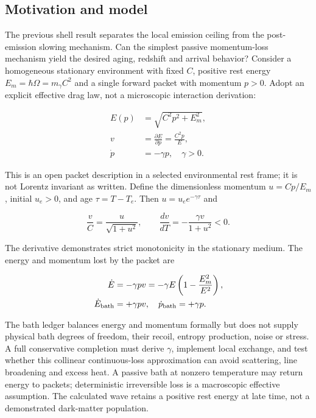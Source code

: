 \documentclass[
  11pt,
  twoside]{article}
\begin{document}
\subsection{Motivation and model}\label{motivation-and-model}

The previous shell result separates the local emission ceiling from the
post-emission slowing mechanism. Can the simplest passive momentum-loss
mechanism yield the desired aging, redshift and arrival behavior?
Consider a homogeneous stationary environment with fixed \(C\), positive
rest energy \(E_m=\hbar\Omega=m_\gamma C^2\) and a single forward packet
with momentum \(p>0\). Adopt an explicit effective drag law, not a
microscopic interaction derivation:

\[\begin{aligned}E(p)&=\sqrt{C^2p^2+E_m^2},\\v&=\frac{\partial E}{\partial p}=\frac{C^2p}{E},\\\dot p&=-\gamma p,\quad \gamma>0.\end{aligned}\]

This is an open packet description in a selected environmental rest
frame; it is not Lorentz invariant as written. Define the dimensionless
momentum \(u=Cp/E_m\), initial \(u_e>0\), and age \(\tau=T-T_e\). Then
\(u=u_e e^{-\gamma\tau}\) and

\[\frac{v}{C}=\frac{u}{\sqrt{1+u^2}},\qquad \frac{d v}{dT}=-\frac{\gamma v}{1+u^2}<0.\]

The derivative demonstrates strict monotonicity in the stationary
medium. The energy and momentum lost by the packet are

\[\begin{aligned}\dot E&=-\gamma pv=-\gamma E\left(1-\frac{E_m^2}{E^2}\right),\\\dot E_{\rm bath}&=+\gamma pv,\quad \dot p_{\rm bath}=+\gamma p.\end{aligned}\]

The bath ledger balances energy and momentum formally but does not
supply physical bath degrees of freedom, their recoil, entropy
production, noise or stress. A full conservative completion must derive
\(\gamma\), implement local exchange, and test whether this collinear
continuous-loss approximation can avoid scattering, line broadening and
excess heat. A passive bath at nonzero temperature may return energy to
packets; deterministic irreversible loss is a macroscopic effective
assumption. The calculated wave retains a positive rest energy at late
time, not a demonstrated dark-matter population.
\end{document}

